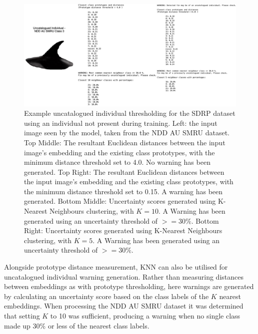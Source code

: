 \begin{figure}[t]
	\begin{center}
		\includegraphics[width=0.9\linewidth]{Chapter7/figs/uncatalogued-individual-thresholding-updated.png}
	\end{center}
	\caption[Example uncatalogued individual thresholding for the SDRP dataset using an individual not present during training.]{Example uncatalogued individual thresholding for the SDRP dataset using an individual not present during training. Left: the input image seen by the model, taken from the NDD AU SMRU dataset.  Top Middle: The resultant Euclidean distances between the input image's embedding and the existing class prototypes, with the minimum distance threshold set to 4.0. No warning has been generated. Top Right: The resultant Euclidean distances between the input image's embedding and the existing class prototypes, with the minimum distance threshold set to 0.15. A warning has been generated. Bottom Middle: Uncertainty scores generated using K-Nearest Neighbours clustering, with $K = 10$. A Warning has been generated using an uncertainty threshold of $>=30\%$. Bottom Right: Uncertainty scores generated using K-Nearest Neighbours clustering, with $K = 5$. A Warning has been generated using an uncertainty threshold of $>=30\%$.}
	\label{fig:uncatalogued-individual-example-sdrp}
\end{figure}

Alongside prototype distance measurement, KNN can also be utilised for uncatalogued individual warning generation. Rather than measuring distances between embeddings as with prototype thresholding, here warnings are generated by calculating an uncertainty score based on the class labels of the $K$ nearest embeddings. When processing the NDD AU SMRU dataset it was determined that setting $K$ to 10 was sufficient, producing a warning when no single class made up 30\% or less of the nearest class labels. 

